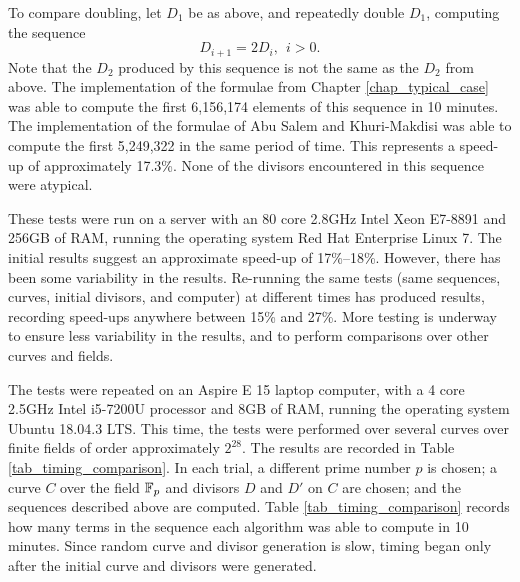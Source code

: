 To compare doubling, let $D_1$ be as above,
and repeatedly double $D_1$, computing the sequence
  \[ D_{i+1} = 2D_i, ~~ i > 0. \]
Note that the $D_2$ produced by this sequence is not the same as the $D_2$ from above.
The implementation of the formulae from Chapter \ref{chap_typical_case} was able to compute
the first 6,156,174 elements of this sequence in 10 minutes.
The implementation of the formulae of Abu Salem and Khuri-Makdisi was able to compute
the first 5,249,322 in the same period of time.
This represents a speed-up of approximately 17.3\%.
None of the divisors encountered in this sequence were atypical.

These tests were run on a server with an 80 core 2.8GHz Intel Xeon E7-8891 and 256GB of RAM,
running the operating system Red Hat Enterprise Linux 7.
The initial results suggest an approximate speed-up of 17\%--18\%.
However, there has been some variability in the results.
Re-running the same tests (same sequences, curves, initial divisors, and computer)
at different times has produced results, recording speed-ups anywhere between 15\% and 27\%.
More testing is underway to ensure less variability in the results,
and to perform comparisons over other curves and fields.

The tests were repeated on an Aspire E 15 laptop computer,
with a 4 core 2.5GHz Intel i5-7200U processor and 8GB of RAM,
running the operating system Ubuntu 18.04.3 LTS.
This time, the tests were performed over several curves
over finite fields of order approximately $2^{28}$.
The results are recorded in Table \ref{tab_timing_comparison}.
In each trial, a different prime number $p$ is chosen;
a curve $C$ over the field $\mathbb{F}_p$ and divisors $D$ and $D'$ on $C$ are chosen;
and the sequences described above are computed.
Table \ref{tab_timing_comparison} records how many terms in the sequence each algorithm was able to compute in 10 minutes.
Since random curve and divisor generation is slow,
timing began only after the initial curve and divisors were generated.

